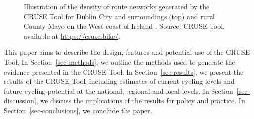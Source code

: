 \documentclass[
  super,
  preprint,
  3p]{elsarticle}
\providecommand{\DIFadd}[1]{{\protect\color{blue}\uwave{#1}}} %
\providecommand{\DIFaddFL}[1]{\DIFadd{#1}} %
\providecommand{\DIFaddbeginFL}{} %
\providecommand{\DIFaddendFL}{} %
\providecommand{\DIFdelbeginFL}{} %
\providecommand{\DIFdelendFL}{} %
\newcommand{\DIFscaledelfig}{0.5}
\newlength{\DIFdelgraphicswidth} %
\newlength{\DIFdelgraphicsheight} %
\newcommand{\DIFaddincludegraphics}[2][]{{\color{blue}\fbox{\DIFOincludegraphics[#1]{#2}}}} %
\newcommand{\DIFdelincludegraphics}[2][]{%
\sbox{\DIFdelgraphicsbox}{\DIFOincludegraphics[#1]{#2}}%
\settoboxwidth{\DIFdelgraphicswidth}{\DIFdelgraphicsbox} %
\settoboxtotalheight{\DIFdelgraphicsheight}{\DIFdelgraphicsbox} %
\scalebox{\DIFscaledelfig}{%
\parbox[b]{\DIFdelgraphicswidth}{\usebox{\DIFdelgraphicsbox}\\[-\baselineskip] \rule{\DIFdelgraphicswidth}{0em}}\llap{\resizebox{\DIFdelgraphicswidth}{\DIFdelgraphicsheight}{%
\setlength{\unitlength}{\DIFdelgraphicswidth}%
\begin{picture}(1,1)%
\thicklines\linethickness{2pt} %
{\color[rgb]{1,0,0}\put(0,0){\framebox(1,1){}}}%
{\color[rgb]{1,0,0}\put(0,0){\line( 1,1){1}}}%
{\color[rgb]{1,0,0}\put(0,1){\line(1,-1){1}}}%
\end{picture}%
}\hspace*{3pt}}} %
} %
\DeclareRobustCommand{\DIFaddbeginFL}{\DIFOaddbeginFL \let\includegraphics\DIFaddincludegraphics} %
\DeclareRobustCommand{\DIFaddendFL}{\DIFOaddendFL \let\includegraphics\DIFOincludegraphics} %
\DeclareRobustCommand{\DIFdelbeginFL}{\DIFOdelbeginFL \let\includegraphics\DIFdelincludegraphics} %
\DeclareRobustCommand{\DIFdelendFL}{\DIFOaddendFL \let\includegraphics\DIFOincludegraphics} %
\begin{document}
\begin{figure}

\DIFdelbeginFL %



\DIFdelendFL \DIFaddbeginFL {}
\DIFaddendFL 

\caption{\label{fig-dublin}Illustration of the density of route networks
generated by the CRUSE Tool for Dublin City and surroundings (top) and
rural County Mayo on the West coast of Ireland \DIFaddbeginFL \DIFaddFL{(botton)}\DIFaddendFL . Source: CRUSE
Tool, available at \url{https://cruse.bike/}.}

\end{figure}%

This paper aims to describe the design, features and potential use of
the CRUSE Tool. In Section~\ref{sec-methods}, we outline the methods
used to generate the evidence presented in the CRUSE Tool. In
Section~\ref{sec-results}, we present the results of the CRUSE Tool,
including estimates of current cycling levels and future cycling
potential at the national, regional and local levels. In
Section~\ref{sec-discussion}, we discuss the implications of the results
for policy and practice. In Section~\ref{sec-conclusions}, we conclude
the paper.
\end{document}
